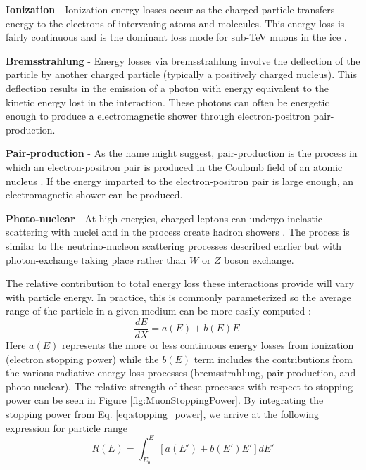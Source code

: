 \documentclass{gatech-thesis}
\begin{document}
\begin{adjustwidth}{2.5em}{2.5em}
\setlength{\parindent}{0pt}
\textbf{Ionization} - Ionization energy losses occur as the charged particle transfers energy to the electrons of intervening atoms and molecules. This energy loss is fairly continuous and is the dominant loss mode for sub-TeV muons in the ice \cite{2001ADNDT..78..183G}.

\textbf{Bremsstrahlung} - Energy losses via bremsstrahlung involve the deflection of the particle by another charged particle (typically a positively charged nucleus). This deflection results in the emission of a photon with energy equivalent to the kinetic energy lost in the interaction. These photons can often be energetic enough to produce a electromagnetic shower through electron-positron pair-production.

\textbf{Pair-production} - As the name might suggest, pair-production is the process in which an electron-positron pair is produced in the Coulomb field of an atomic nucleus \cite{2001ADNDT..78..183G}. If the energy imparted to the electron-positron pair is large enough, an electromagnetic shower can be produced.

\textbf{Photo-nuclear} - At high energies, charged leptons can undergo inelastic scattering with nuclei and in the process create hadron showers \cite{2003PhRvD..67c4027B}. The process is similar to the neutrino-nucleon scattering processes described earlier but with photon-exchange taking place rather than $W$ or $Z$ boson exchange.
\end{adjustwidth}
\setlength{\parindent}{17.5pt}
The relative contribution to total energy loss these interactions provide will vary with particle energy. In practice, this is commonly parameterized so the average range of the particle in a given medium can be more easily computed \cite{2001ADNDT..78..183G}:
\begin{equation}\label{eq:stopping_power}
-\frac{dE}{dX} = a(E) + b(E) E
\end{equation}
Here $a(E)$ represents the more or less continuous energy losses from ionization (electron stopping power) while the $b(E)$ term includes the contributions from the various radiative energy loss processes (bremsstrahlung, pair-production, and photo-nuclear). The relative strength of these processes with respect to stopping power can be seen in Figure \ref{fig:MuonStoppingPower}. By integrating the stopping power from Eq. \ref{eq:stopping_power}, we arrive at the following expression for particle range
\begin{equation}\label{eq:range}
R(E) = \int_{E_0}^{E}[a(E') + b(E')E']dE'
\end{equation}
\end{document}
